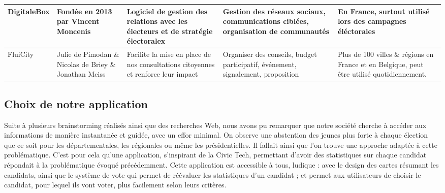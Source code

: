 \begin{tabularx}{\textwidth}{X|X|X|X|X}
    \hline
    DigitaleBox & Fondée en 2013 par Vincent Moncenis & Logiciel de gestion des relations avec les électeurs et de stratégie électoralex & Gestion des réseaux sociaux, communications ciblées, organisation de communautés & En France, surtout utilisé lors des campagnes éléctorales\\
    \hline
    FluiCity & 	Julie de Pimodan \& Nicolas de Briey \& Jonathan Meiss & Facilite la mise en place de nos consultations citoyennes et renforce leur impact & Organiser des conseils, budget participatif, événement, signalement, proposition & Plus de 100 villes \& régions en France et en Belgique, peut être utilisé quotidiennement.\\
\end{tabularx}

\vskip 0.25cm
\subsection{Choix de notre application}
\vskip 0.25cm
\noindent
Suite à plusieurs brainstorming réalisés ainsi que des recherches Web, nous avons pu remarquer que notre société cherche à accéder aux informations de manière instantanée et guidée, avec un effor minimal. On observe une abstention des jeunes plus forte à chaque élection que ce soit pour les départementales, les régionales ou même les présidentielles. Il fallait ainsi que l'on trouve une approche adaptée à cette problématique.
\vskip 0.25cm
\noindent
C'est pour cela qu'une application, s'inspirant de la Civic Tech, permettant d'avoir des statistiques sur chaque candidat répondait à la problématique évoqué précédemment. Cette application est accessible à tous, ludique : avec le design des cartes résumant les candidats, ainsi que le système de vote qui permet de réévaluer les statistiques d'un candidat ; et permet aux utilisateurs de choisir le candidat, pour lequel ils vont voter, plus facilement selon leurs critères.
\vskip 0.25cm
